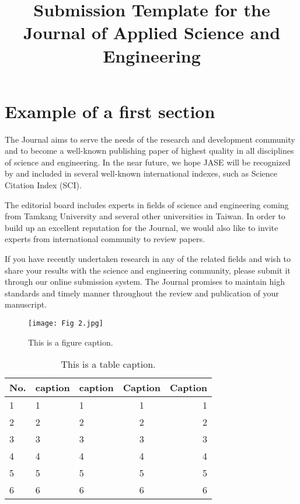 \documentclass[12pt,onecolumn]{JASE}
\title{Submission Template for the Journal of Applied Science and Engineering}
\author[1,*]{\normalfont{First author}}
\author[2]{\normalfont{Second author}}
\author[3]{\normalfont{Third author}}
\affil[1]{First author address}
\affil[2]{Second author address}
\affil[3]{Third author address}
\affil[*]{Corresponding author. E-mail:***Corresponding author email address***}
\begin{document}
\maketitle
\linenumbers
 
\section{Example of a first section}

The Journal aims to serve the needs of the research and development community and to become a well-known publishing paper of highest quality in all disciplines of science and engineering. In the near future, we hope JASE will be recognized by and included in several well-known international indexes, such as Science Citation Index (SCI).

The editorial board includes experts in fields of science and engineering coming from Tamkang University and several other universities in Taiwan. In order to build up an excellent reputation for the Journal, we would also like to invite experts from international community to review papers.

If you have recently undertaken research in any of the related fields and wish to share your results with the science and engineering community, please submit it through our online submission system. The Journal promises to maintain high standards and timely manner throughout the review and publication of your manuscript.



\begin{figure}[bt]
\centering
\texttt{[image: Fig 2.jpg]}
\captionsetup{justification=centering}
\caption{This is a figure caption.}
\label{fig:example}
\end{figure}

\begin{table}[bt]
\captionsetup{justification=centering}
\caption{This is a table caption.}
\label{tab:example}
\centering
\begin{tabular}{l l l c r}
\hline
No. & caption & caption & Caption& Caption \\
\hline
1&1&1&1&1\\
2&2&2&2&2\\
3&3&3&3&3\\
4&4&4&4&4\\
5&5&5&5&5\\
6&6&6&6&6\\
\hline
\end{tabular}
\end{table}
\end{document}
